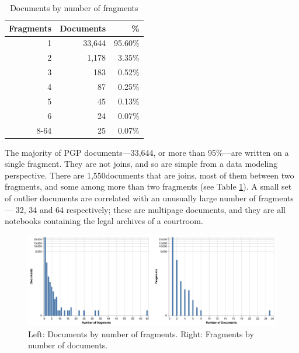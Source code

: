 \documentclass{article}
\def\singleFragmentDocuments{33,644}
\def\totalJoins{1,550}
\begin{document}
\begin{table}
\begin{center}
\caption{Documents by number of fragments}
\label{table:docs_per_numfrags}
\begin{tabular}{rrr}
\toprule
{Fragments} & {Documents} & {\%}\\
\midrule
1 & 33,644 & 95.60\% \\
2 & 1,178 & 3.35\% \\
3 & 183 & 0.52\% \\
4 & 87 & 0.25\% \\
5 & 45 & 0.13\% \\
6 & 24 & 0.07\% \\
8-64 & 25 & 0.07\% \\
\bottomrule
\end{tabular}
\end{center}
\end{table}

The majority of PGP documents—\singleFragmentDocuments, or more than 95\%—are written on a single fragment. They are not joins, and so are simple from a data modeling perspective. There are \totalJoins\space documents that are joins, most of them between two fragments, and some among more than two fragments (see Table \ref{table:docs_per_numfrags}). A small set of outlier documents are correlated with an unusually large number of fragments — 32, 34 and 64 respectively; these are multipage documents, and they are all notebooks containing the legal archives of a courtroom.


\begin{figure}[!hbt]
  \includegraphics[width=1.0\linewidth]{charts/docs_frags_2up.pdf}
  \centering
  \caption{Left: Documents by number of fragments. Right: Fragments by number of documents.}
  \label{fig:docs_per_num_frags}
\end{figure}

\end{document}

